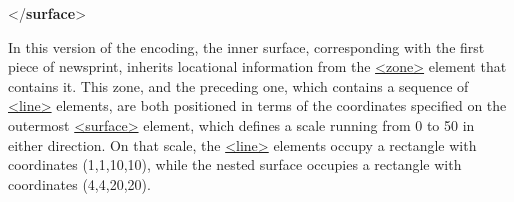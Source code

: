 \begin{shaded}
\mbox{}\newline 
{</\textbf{surface}>}\end{shaded}\egroup\par \noindent  In this version of the encoding, the inner surface, corresponding with the first piece of newsprint, inherits locational information from the \hyperref[TEI.zone]{<zone>} element that contains it. This zone, and the preceding one, which contains a sequence of \hyperref[TEI.line]{<line>} elements, are both positioned in terms of the coordinates specified on the outermost \hyperref[TEI.surface]{<surface>} element, which defines a scale running from 0 to 50 in either direction. On that scale, the \hyperref[TEI.line]{<line>} elements occupy a rectangle with coordinates (1,1,10,10), while the nested surface occupies a rectangle with coordinates (4,4,20,20).\par
